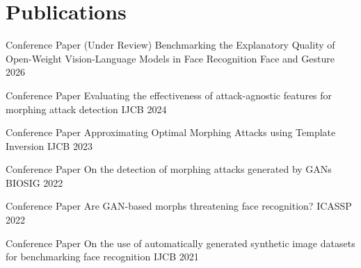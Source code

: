 

\section{Publications}
\begin{cvhonors}

  \cvhonor
    {Conference Paper (Under Review)} %
    {Benchmarking the Explanatory Quality of Open-Weight Vision-Language Models in Face Recognition} %
    {Face and Gesture} %
    {2026} %

  \cvhonor
    {Conference Paper} %
    {Evaluating the effectiveness of attack-agnostic features for morphing attack detection} %
    {IJCB} %
    {2024} %

  \cvhonor
    {Conference Paper} %
    {Approximating Optimal Morphing Attacks using Template Inversion} %
    {IJCB} %
    {2023} %

  \cvhonor
    {Conference Paper} %
    {On the detection of morphing attacks generated by GANs} %
    {BIOSIG} %
    {2022} %

  \cvhonor
    {Conference Paper} %
    {Are GAN-based morphs threatening face recognition?} %
    {ICASSP} %
    {2022} %

  \cvhonor
    {Conference Paper} %
    {On the use of automatically generated synthetic image datasets for benchmarking face recognition} %
    {IJCB} %
    {2021} %

\end{cvhonors}
